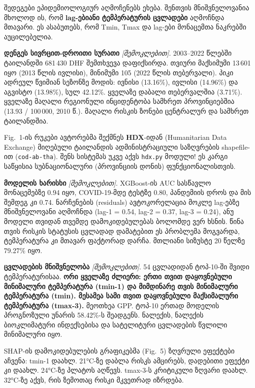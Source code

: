 \documentclass[11pt,a4paper]{article}
\newcommand{\imp}[1]{\textbf{\color{importred}#1}}
\begin{document}
\begin{skipbox}
შედეგები ეპიდემიოლოგიურ აღმოჩენებს ეხება. შენთვის მნიშვნელოვანია მხოლოდ ის, რომ \textbf{lag-ებიანი
ტემპერატურის ცვლადები} აღმოჩნდა მთავარი. ეს ასაბუთებს, რომ Tmin, Tmax და lag-ები მონაცემთა ნაკრებში აუცილებელია.
\end{skipbox}

\textbf{დენგეს სივრცით-დროითი სურათი} \textit{[შემოკლებით]}. 2003--2022 წლებში ტაილანდში 681\,430 DHF შემთხვევა
დაფიქსირდა. თვიური მაქსიმუმი 13\,601 იყო (2013 წლის ივლისი), მინიმუმი 105 (2022 წლის თებერვალი).
პიკი ადრეულ წვიმიან სეზონზე მოდის: ივნისი (13.16\%), ივლისი (14.96\%) და აგვისტო (13.98\%), სულ 42.12\%.
ყველაზე დაბალი თებერვალშია (3.71\%). ყველაზე მაღალი რეგიონული ინციდენტობა სამხრეთ პროვინციებშია
(13.93 / 100\,000, 2010 წ.). მაღალი რისკის ზონები ცენტრალურ და სამხრეთ ტაილანდშია.

\begin{etl}
Fig.~1-ის რუკები ავტორებმა შექმნეს \imp{HDX}-იდან (Humanitarian Data Exchange) მიღებული ტაილანდის
ადმინისტრაციული საზღვრების shapefile-ით (\texttt{cod-ab-tha}). შენს სისტემას უკვე აქვს \texttt{hdx.py} მოდული!
ეს კარგი საწყისია სუბნაციონალური (პროვინციის დონის) ფუნქციონალისთვის.
\end{etl}

\textbf{მოდელის ხარისხი} \textit{[შემოკლებით]}. XGBoost-ის AUC სასწავლო მონაცემებზე 0.94 იყო, COVID-19-მდე
ტესტზე 0.80, პანდემიის დროს და მის შემდეგ კი 0.74. ნარჩენების (residuals) ავტოკორელაცია მოკლე lag-ებზე
მნიშვნელოვანი აღმოჩნდა (lag-1 = 0.54, lag-2 = 0.37, lag-3 = 0.24), ანუ მოდელი თვიდან თვემდე დამოკიდებულებას
ბოლომდე ვერ ხსნის. წინა თვის რისკის სტატუსის ცვლადად დამატებით ეს პრობლემა მოგვარდა, ტემპერატურა კი
მთავარ ფაქტორად დარჩა. მთლიანი სიზუსტე 20 წელზე 79.27\% იყო.

\textbf{ცვლადების მნიშვნელობა} \textit{[შემოკლებით]}. 54 ცვლადიდან ტოპ-10-ში შვიდი ტემპერატურისაა.
\imp{ორი ყველაზე ძლიერი: ერთი თვით დაყოვნებული მინიმალური ტემპერატურა (tmin-1) და მიმდინარე თვის
მინიმალური ტემპერატურა (tmin). მესამეა სამი თვით დაყოვნებული მაქსიმალური ტემპერატურა (tmax-3).}
მეოთხეა GPP. ტოპ-10 ერთად მოდელის პროგნოზული უნარის 58.42\%-ს შეადგენს. ნალექის, ნალექის
ბიოკლიმატური ინდექსებისა და სატელიტური ცვლადების წვლილი მინიმალური იყო.

SHAP-ის დამოკიდებულების გრაფიკებმა (Fig.~5) ზღვრული ეფექტები აჩვენა: tmin-1 დაახლ. 21°C-ზე დაბლა
რისკს ამცირებს, დადებითი ეფექტი კი დაახლ. 24°C-ზე პლატოს აღწევს. tmax-3-ს კრიტიკული ზღვარი დაახლ.
32°C-ზე აქვს, რის ზემოთაც რისკი მკვეთრად იზრდება.
\end{document}
